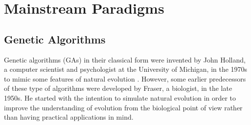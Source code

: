 


	\section{Mainstream Paradigms}
	\label{evoalg:s:mainstreamParadigms}

	\subsection{Genetic Algorithms}
	\label{evoalg:subs:geneticAlgorithms}

Genetic algorithms (GAs) in their classical form were invented
by John Holland, a computer scientist and psychologist at the
University of Michigan, in the 1970s to mimic some features of natural
evolution \cite{Holland:75}.  However, some earlier predecessors of
these type of algorithms were developed by Fraser, a biologist, in the
late 1950s. He started with the intention to simulate natural
evolution in order to improve the understanding of evolution from the
biological point of view rather than having practical applications in
mind.

